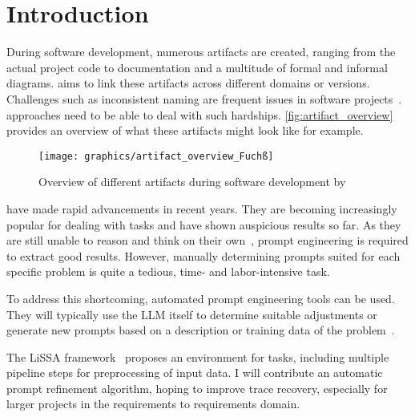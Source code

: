 
\chapter{Introduction}
\label{ch:Introduction}
During software development, numerous artifacts are created, ranging from the actual project code to documentation and a multitude of formal and informal diagrams. \TLR aims to link these artifacts across different domains or versions.
Challenges such as inconsistent naming are frequent issues in software projects~\cite{wohlrab2019ImprovingConsistency}. \TLR approaches need to be able to deal with such hardships. \autoref{fig:artifact_overview} provides an overview of what these artifacts might look like for example.

\begin{figure}
    \centering
    \texttt{[image: graphics/artifact\_overview\_Fuchß]}
    \caption{Overview of different artifacts during software development by }
    \label{fig:artifact_overview}
\end{figure}

\LLMs have made rapid advancements in recent years.
They are becoming increasingly popular for dealing with \TLR tasks and have shown auspicious results so far.
As they are still unable to reason and think on their own~\cite{shojaee2025IllusionThinking}, prompt engineering is required to extract good results.
However, manually determining prompts suited for each specific problem is quite a tedious, time- and labor-intensive task.

To address this shortcoming, automated prompt engineering tools can be used.
They will typically use the LLM itself to determine suitable adjustments or generate new prompts based on a description or training data of the problem~\cite{ramnath2025SystematicSurvey}.

The LiSSA framework~\cite{fuchss2025LiSSAGeneric} proposes an environment for \TLR tasks, including multiple pipeline steps for preprocessing of input data.
I will contribute an automatic prompt refinement algorithm, hoping to improve trace recovery, especially for larger projects in the requirements to requirements domain.
